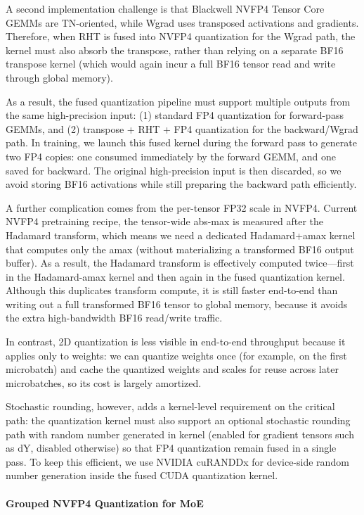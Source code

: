 A second implementation challenge is that Blackwell NVFP4 Tensor Core GEMMs are TN-oriented, while Wgrad uses transposed activations and gradients. Therefore, when RHT is fused into NVFP4 quantization for the Wgrad path, the kernel must also absorb the transpose, rather than relying on a separate BF16 transpose kernel (which would again incur a full BF16 tensor read and write through global memory).

As a result, the fused quantization pipeline must support multiple outputs from the same high-precision input: (1) standard FP4 quantization for forward-pass GEMMs, and (2) transpose + RHT + FP4 quantization for the backward/Wgrad path. In training, we launch this fused kernel during the forward pass to generate two FP4 copies: one consumed immediately by the forward GEMM, and one saved for backward. The original high-precision input is then discarded, so we avoid storing BF16 activations while still preparing the backward path efficiently.

A further complication comes from the per-tensor FP32 scale in NVFP4. Current NVFP4 pretraining recipe, the tensor-wide abs-max is measured after the Hadamard transform, which means we need a dedicated Hadamard+amax kernel that computes only the amax (without materializing a transformed BF16 output buffer). As a result, the Hadamard transform is effectively computed twice—first in the Hadamard-amax kernel and then again in the fused quantization kernel. Although this duplicates transform compute, it is still faster end-to-end than writing out a full transformed BF16 tensor to global memory, because it avoids the extra high-bandwidth BF16 read/write traffic.

In contrast, 2D quantization is less visible in end-to-end throughput because it applies only to weights: we can quantize weights once (for example, on the first microbatch) and cache the quantized weights and scales for reuse across later microbatches, so its cost is largely amortized. 

Stochastic rounding, however, adds a kernel-level requirement on the critical path: the quantization kernel must also support an optional stochastic rounding path with random number generated in kernel (enabled for gradient tensors such as dY, disabled otherwise) so that FP4 quantization remain fused in a single pass. To keep this efficient, we use NVIDIA cuRANDDx\cite{curanddx} for device-side random number generation inside the fused CUDA quantization kernel.

\paragraph{Grouped NVFP4 Quantization for MoE}

